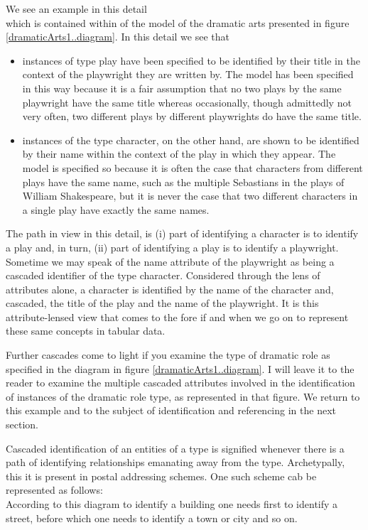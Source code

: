 \mynote
We see an example in this detail
\begin{equation*}

\end{equation*}
which is contained within of the model of the dramatic arts presented in figure \ref{dramaticArts1..diagram}. 
In this detail we see that
\begin{itemize}
\item
instances of  type play have been specified to be identified by their title 
in the context of the playwright  they are written by.
The model has been specified in this way 
because it is a fair assumption that no two plays by the same playwright have the same title
whereas occasionally, though admittedly not very often, 
two different plays by different playwrights do have the same title.  
\item instances of the type character, on the other hand,  are shown to be identified by their name within the context of the play in which they appear. 
The model is specified so because it is often the case that characters from different plays have the same name, such as the multiple Sebastians in the plays of William Shakespeare, but it is never the case that two different characters in a single play have exactly the same names.
\end{itemize}

The path in view in this detail, is 
(i)  part of identifying a character is to identify a play and, in turn,
(ii) part of identifying a play is to identify a playwright. 
Sometime we may speak of the name attribute of the playwright as being a cascaded identifier of the type character. Considered through the lens of attributes alone, a character is identified by the name of the character and, 
cascaded, the title of the play and the name of the playwright.
It is this attribute-lensed view that comes to the fore if and when we go on to represent these same concepts in tabular data.  

\begin{oldtt}
Further cascades come to light if you examine the type of dramatic role 
as specified in the diagram in figure \ref{dramaticArts1..diagram}. I will leave it to the reader to examine the multiple cascaded attributes involved in the identification of instances of the dramatic role type, as represented in that figure. 
We return to this example and to the subject of identification and referencing in the next section.
\end{oldtt}
\begin{newtt}
Cascaded identification of an entities of a type is signified whenever there is a path of identifying relationships emanating away from the type. 
Archetypally, this it is present in postal addressing schemes. One such scheme cab be represented as follows:
\begin{equation*}

\end{equation*}
According to this diagram to identify a building one needs first to identify a street, before which one needs to identify a town or city and so on.
\end{newtt}

